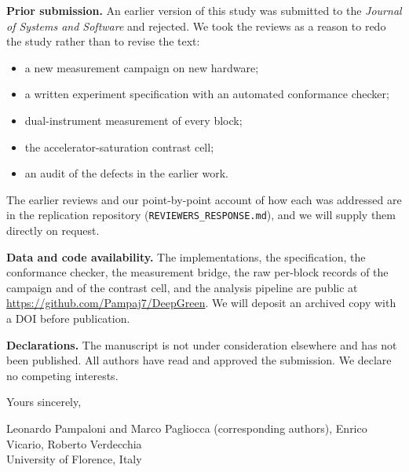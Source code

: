 \documentclass[11pt,a4paper]{article}
\begin{document}
\textbf{Prior submission.} An earlier version of this study was submitted to the
\textit{Journal of Systems and Software} and rejected. We took the reviews as a reason
to redo the study rather than to revise the text:
\begin{itemize}[nosep,topsep=0.2\baselineskip]
\item a new measurement campaign on new hardware;
\item a written experiment specification with an automated conformance checker;
\item dual-instrument measurement of every block;
\item the accelerator-saturation contrast cell;
\item an audit of the defects in the earlier work.
\end{itemize}
\vspace{-0.1\baselineskip}
The earlier reviews and our point-by-point account of how each was addressed
are in the replication repository (\texttt{REVIEWERS\_RESPONSE.md}), and we will supply
them directly on request.

\textbf{Data and code availability.} The implementations, the specification, the
conformance checker, the measurement bridge, the raw per-block records of the
campaign and of the contrast cell, and the analysis pipeline are public at
\url{https://github.com/Pampaj7/DeepGreen}. We will deposit an archived copy with a
DOI before publication.

\textbf{Declarations.} The manuscript is not under consideration elsewhere and has
not been published. All authors have read and approved the submission. We
declare no competing interests.

Yours sincerely,

Leonardo Pampaloni and Marco Pagliocca (corresponding authors), Enrico Vicario,
Roberto Verdecchia\\
University of Florence, Italy
\end{document}
